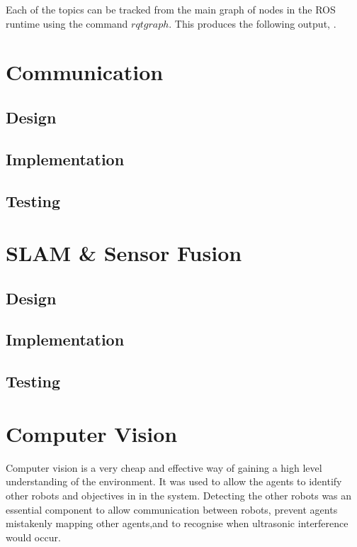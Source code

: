 Each of the topics can be tracked from the main graph of nodes in the ROS runtime using the command $rqt graph$. This produces the following output, . 


\section{Communication}\label{soft/comms}

\subsection{Design}\label{soft/comms/design}

\subsection{Implementation}\label{soft/comms/impl}

\subsection{Testing}\label{soft/comms/test}




\section{SLAM \& Sensor Fusion}\label{soft/SLAM}

\subsection{Design}\label{soft/SLAM/design}

\subsection{Implementation}\label{soft/SLAM/impl}

\subsection{Testing}\label{soft/SLAM/test}



\section{Computer Vision}\label{soft/cv}
Computer vision is a very cheap and effective way of gaining a high level understanding of the environment. It was used to allow the agents to identify other robots and objectives in in the system. Detecting the other robots was an essential component to allow communication between robots, prevent agents mistakenly mapping other agents,and to recognise when ultrasonic interference would occur. 

